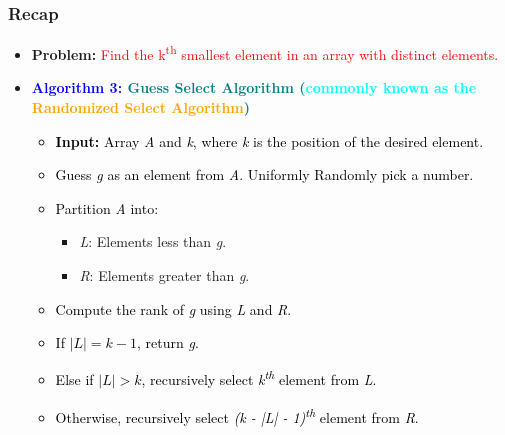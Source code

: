 \begin{frame}
    \frametitle{Recap}
    \vspace{0.3cm} %
    \begin{itemize}
        \item \textbf{Problem:} \textcolor{red}{Find the k\textsuperscript{th} smallest element in an array with distinct elements.}
        \vspace{0.3cm} %
        \item \textcolor{blue}{\textbf{Algorithm 3: \textcolor{teal}{Guess Select Algorithm (}\textcolor{cyan}{commonly known as the} \textcolor{orange}{Randomized Select Algorithm}\textcolor{teal}{)}}}
        \vspace{0.2cm} %
        \begin{itemize}
            \item \textcolor{black}{\textbf{Input:} Array \textit{A} and \textit{k}, where \textit{k} is the position of the desired element.}
            \item \textcolor{black}{Guess \textit{g} as an element from \textit{A}. Uniformly Randomly pick a number.}
            \item \textcolor{black}{Partition \textit{A} into:}
            \begin{itemize}
                \item \textit{L}: Elements less than \textit{g}.
                \item \textit{R}: Elements greater than \textit{g}.
            \end{itemize}
            \item \textcolor{black}{Compute the rank of \textit{g} using \textit{L} and \textit{R}.}
            \item \textcolor{black}{If $|L| = k-1$, return \textit{g}.}
            \item \textcolor{black}{Else if $|L| > k$, recursively select \textit{k\textsuperscript{th}} element from \textit{L}.}
            \item \textcolor{black}{Otherwise, recursively select \textit{(k - |L| - 1)\textsuperscript{th}} element from \textit{R}.}
        \end{itemize}
    \end{itemize}
    \vspace{0.5cm} %
\end{frame}


